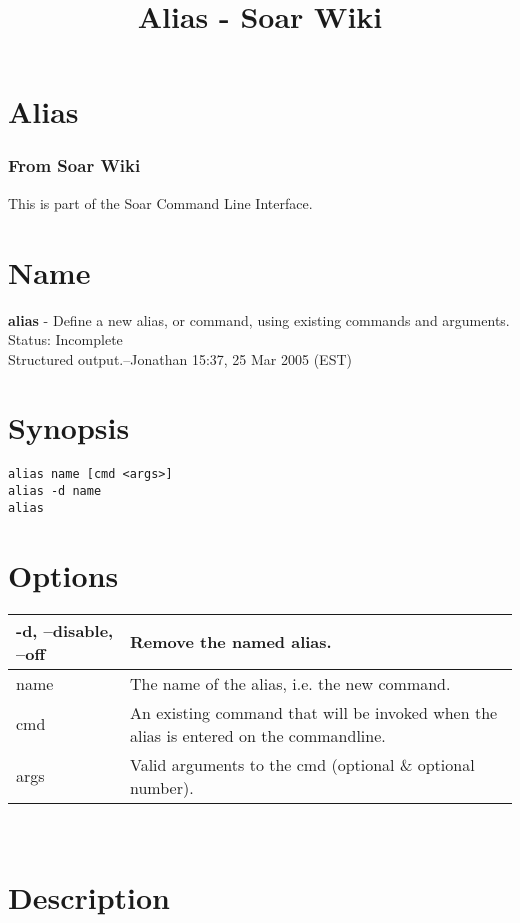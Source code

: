 \documentclass[10pt]{article}
\title{Alias - Soar Wiki}
\begin{document}
\section*{Alias}
\subsubsection*{From Soar Wiki}


 This is part of the Soar Command Line Interface. 
\section*{ Name }


 \textbf{alias}
 - Define a new alias, or command, using existing commands and arguments.\\ 
 Status: Incomplete\\ 
Structured output.--Jonathan 15:37, 25 Mar 2005 (EST) 
\section*{ Synopsis }


  \begin{verbatim}
alias name [cmd <args>]
alias -d name
alias

\end{verbatim}



 
\section*{ Options }


\begin{tabular}{|p{1in}|p{5in}|}
\hline 
 -d, --disable, --off  & Remove the named alias.  \\
 \hline 
 name  & The name of the alias, i.e. the new command.  \\
 \hline 
 cmd  & An existing command that will be invoked when the alias is entered on the commandline.  \\
 \hline 
 args  & Valid arguments to the cmd (optional \& optional number).  \\
 \hline 

\end{tabular}



 \\ 

\section*{ Description }
\end{document}
